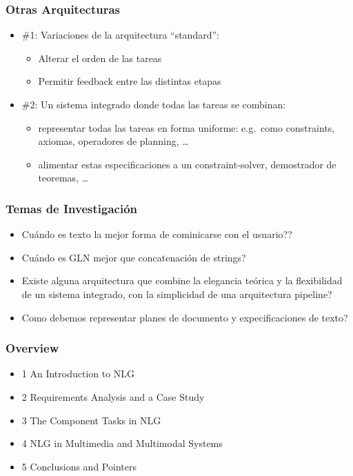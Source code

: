 \documentclass[compress,color=usenames]{beamer}
\begin{document}
\begin{frame}
\frametitle{Otras Arquitecturas}

\label{f60}
\begin{itemize}
\item { {\#1: Variaciones de la arquitectura ``standard'':}}
\begin{itemize}
\item { {Alterar el orden de las tareas}}
\item { {Permitir feedback entre las distintas etapas}}
\end{itemize}
\item { {\#2: Un sistema integrado donde todas las tareas se combinan:}}
\begin{itemize}
\item { {representar todas las tareas en forma uniforme: e.g.\ como constraints, axiomas, operadores de planning, \ldots}}
\item { {alimentar estas especificaciones a un  constraint-solver, demostrador de teoremas, \ldots}}
\end{itemize}
\end{itemize}
\end{frame}

\begin{frame}
\frametitle{Temas de Investigaci\'on}

\label{f62}
\begin{itemize}
\item { {Cu\'ando es texto la mejor forma de cominicarse con el usuario??}}
\item { {Cu\'ando es GLN mejor que concatenaci\'on de strings?}}
\item { {Existe alguna arquitectura que combine la elegancia te\'orica y la flexibilidad de un sistema integrado, con la simplicidad de una arquitectura pipeline?}}
\item { {Como debemos representar planes de documento y expecificaciones de texto?}}
\end{itemize}

\end{frame}

\begin{frame}
\frametitle{Overview}

\label{f64}
\begin{itemize}
\item { {1 An Introduction to NLG}}
\item { {2 Requirements Analysis and a Case Study}}
\item { {3 The Component Tasks in NLG}}
\item { {4 NLG in Multimedia and Multimodal Systems}}
\item { {5 Conclusions and Pointers}}
\end{itemize}

\end{frame}
\end{document}
